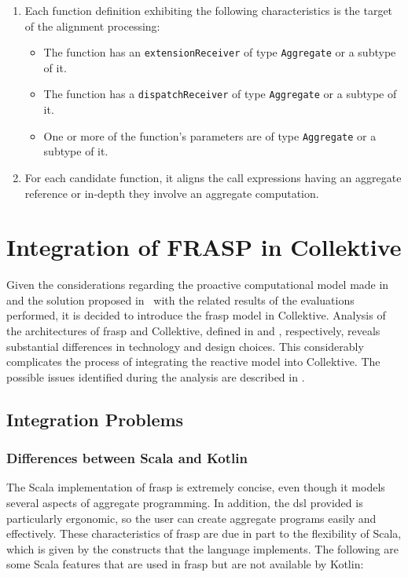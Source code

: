 \begin{enumerate}
    \item Each function definition exhibiting the following characteristics is the target of the alignment processing:
          \begin{itemize}
              \item The function has an \texttt{extensionReceiver} of type \texttt{Aggregate} or a subtype of it.
              \item The function has a \texttt{dispatchReceiver} of type \texttt{Aggregate} or a subtype of it.
              \item One or more of the function's parameters are of type \texttt{Aggregate} or a subtype of it.
          \end{itemize}
    \item For each candidate function, it aligns the call expressions having an aggregate reference or in-depth they involve an aggregate computation.
\end{enumerate}

\section{Integration of FRASP in Collektive}
\label{section:integration-frasp-collektive}

Given the considerations regarding the proactive computational model made in  and the solution proposed in~\cite{Casadei2023} with the related results of the evaluations performed, it is decided to introduce the \ac{frasp} model in Collektive.
Analysis of the architectures of \ac{frasp} and Collektive, defined in  and , respectively, reveals substantial differences in technology and design choices. This considerably complicates the process of integrating the reactive model into Collektive. The possible issues identified during the analysis are described in .

\subsection{Integration Problems}
\label{subsection:integration-problems}

\subsubsection{Differences between Scala and Kotlin}
The Scala implementation of \ac{frasp} is extremely concise, even though it models several aspects of aggregate programming. In addition, the \ac{dsl} provided is particularly ergonomic, so the user can create aggregate programs easily and effectively. These characteristics of \ac{frasp} are due in part to the flexibility of Scala, which is given by the constructs that the language implements. The following are some Scala features that are used in \ac{frasp} but are not available by Kotlin:

